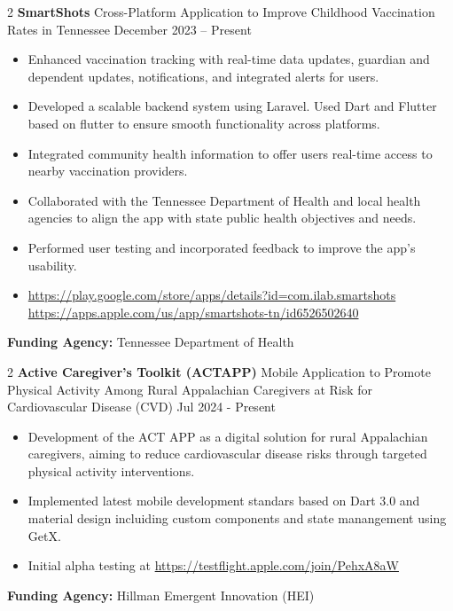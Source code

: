 \documentclass[10pt, letterpaper]{article}
\newenvironment{highlights}{
    \begin{itemize}[
        topsep=0.10 cm,
        parsep=0.10 cm,
        partopsep=0pt,
        itemsep=0pt,
        leftmargin=0 cm + 10pt
    ]
}{
    \end{itemize}
} %
\newenvironment{twocolentry}[2][]{
    \onecolentry
    \def\secondColumn{#2}
    \setcolumnwidth{\fill, 4.5 cm}
    \begin{paracol}{2}
}{
    \switchcolumn \raggedleft \secondColumn
    \end{paracol}
    \endonecolentry
} %
\begin{document}
        \vspace{0.3cm} \begin{twocolentry}{December 2023 – Present} \textbf{SmartShots} \textbar Cross-Platform Application to Improve Childhood Vaccination Rates in Tennessee \end{twocolentry} \begin{highlights} 
            \item Enhanced vaccination tracking with real-time data updates, guardian and dependent updates, notifications, and integrated alerts for users. 
            \item Developed a scalable backend system using Laravel. Used Dart and Flutter based on flutter to ensure smooth functionality across platforms. 
            \item Integrated community health information to offer users real-time access to nearby vaccination providers.
             \item Collaborated with the Tennessee Department of Health and local health agencies to align the app with state public health objectives and needs. 
             \item Performed user testing and incorporated feedback to improve the app’s usability. 
             \item \url{https://play.google.com/store/apps/details?id=com.ilab.smartshots} \url{https://apps.apple.com/us/app/smartshots-tn/id6526502640} \end{highlights} \vspace{0.3cm} \noindent \textbf{Funding Agency:} Tennessee Department of Health
    
    \vspace{0.3cm} \begin{twocolentry}{Jul 2024 - Present} \textbf{Active Caregiver’s Toolkit (ACTAPP)} \textbar Mobile Application to Promote Physical Activity Among Rural Appalachian Caregivers at Risk for Cardiovascular Disease (CVD) \end{twocolentry} \begin{highlights} 
        \item Development of the ACT APP as a digital solution for rural Appalachian caregivers, aiming to reduce cardiovascular disease risks through targeted physical activity interventions. 
        \item Implemented latest mobile development standars based on Dart 3.0 and material design incluiding custom components and state manangement using GetX.
        \item Initial alpha testing at \url{https://testflight.apple.com/join/PehxA8aW}
    \end{highlights} \vspace{0.3cm} \noindent \textbf{Funding Agency:} Hillman Emergent Innovation (HEI)
\end{document}

